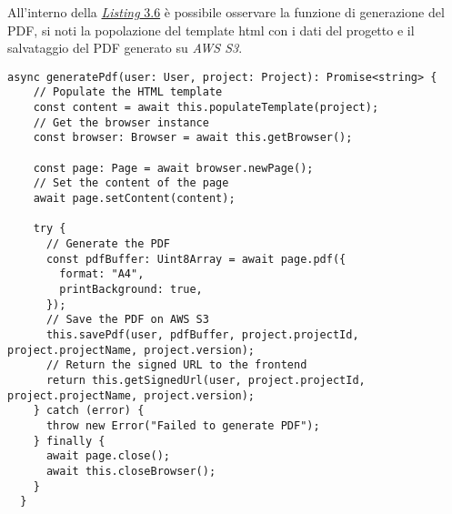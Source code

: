 \noindent All'interno della {\hyperref[lst:funzione-generazione-pdf]{\textit{Listing} 3.6}} è possibile osservare la funzione di generazione del PDF, si noti la popolazione del template \gls{html} con i dati del progetto e il salvataggio del PDF generato su \textit{AWS S3}.
\begin{lstlisting}[caption={Funzione di generazione del PDF, con salvataggio su \textit{AWS S3}}, label={lst:funzione-generazione-pdf}]
async generatePdf(user: User, project: Project): Promise<string> {
    // Populate the HTML template    
    const content = await this.populateTemplate(project);  
    // Get the browser instance
    const browser: Browser = await this.getBrowser(); 

    const page: Page = await browser.newPage();
    // Set the content of the page
    await page.setContent(content); 

    try {
      // Generate the PDF
      const pdfBuffer: Uint8Array = await page.pdf({
        format: "A4",
        printBackground: true,
      }); 
      // Save the PDF on AWS S3
      this.savePdf(user, pdfBuffer, project.projectId, project.projectName, project.version);  
      // Return the signed URL to the frontend
      return this.getSignedUrl(user, project.projectId, project.projectName, project.version);
    } catch (error) {
      throw new Error("Failed to generate PDF");
    } finally {
      await page.close();
      await this.closeBrowser();
    }
  }
\end{lstlisting}